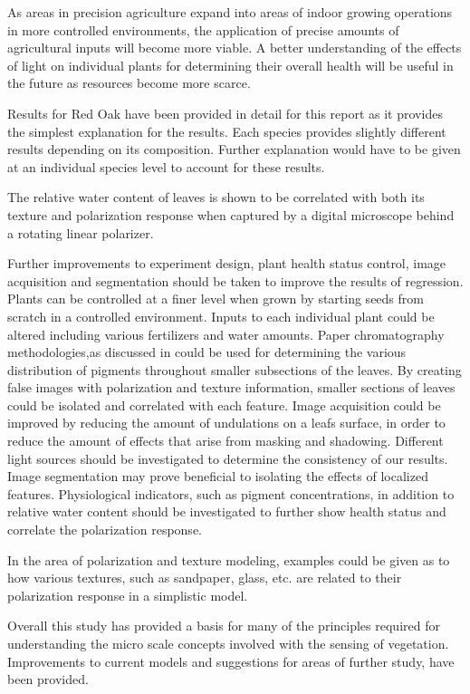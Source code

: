 As areas in precision agriculture expand into areas of indoor growing operations in more controlled environments, the application of precise amounts of agricultural inputs will become more viable.  A better understanding of the effects of light on individual plants for determining their overall health will be useful in the future as resources become more scarce.

Results for Red Oak have been provided in detail for this report as it provides the simplest explanation for the results.  Each species provides slightly different results depending on its composition.  Further explanation would have to be given at an individual species level to account for these results.

The relative water content of leaves is shown to be correlated with both its texture and polarization response when captured by a digital microscope behind a rotating linear polarizer.

Further improvements to experiment design, plant health status control, image acquisition and segmentation should be taken to improve the results of regression.  Plants can be controlled at a finer level when grown by starting seeds from scratch in a controlled environment.  Inputs to each individual plant could be altered including various fertilizers and water amounts.  Paper chromatography methodologies,as discussed in \cite{pigments} could be used for determining the various distribution of pigments throughout smaller subsections of the leaves.  By creating false images with polarization and texture information, smaller sections of leaves could be isolated and correlated with each feature.  Image acquisition could be improved by reducing the amount of undulations on a leafs surface, in order to reduce the amount of effects that arise from masking and shadowing.  Different light sources should be investigated to determine the consistency of our results.  Image segmentation may prove beneficial to isolating the effects of localized features.  Physiological indicators, such as pigment concentrations, in addition to relative water content should be investigated to further show health status and correlate the polarization response.

In the area of polarization and texture modeling, examples could be given as to how various textures, such as sandpaper, glass, etc. are related to their polarization response in a simplistic model.

Overall this study has provided a basis for many of the principles required for understanding the micro scale concepts involved with the sensing of vegetation. Improvements to current models and suggestions for areas of further study, have been provided.
